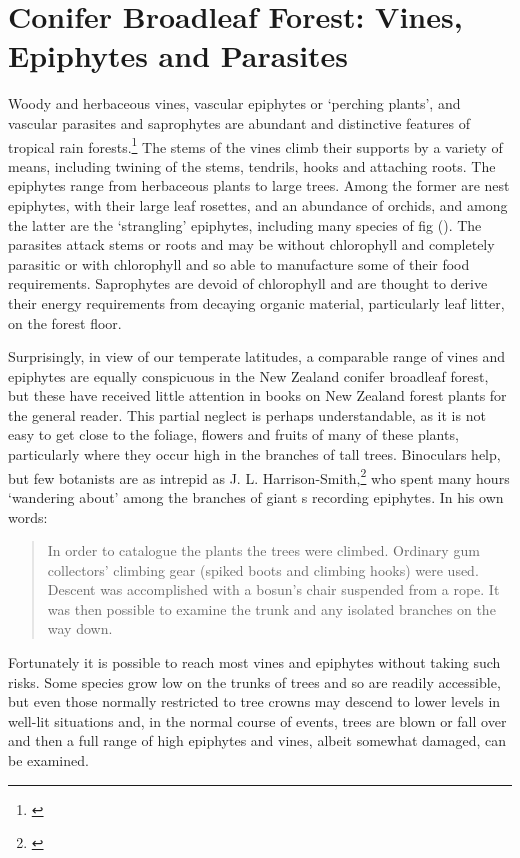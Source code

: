 \chapter{Conifer Broadleaf Forest: Vines, Epiphytes and Parasites}

Woody and herbaceous vines, vascular epiphytes or `perching plants', and vascular parasites and saprophytes are abundant and distinctive features of tropical rain forests.\footnote{\cite{richards1952tropical}}
The stems of the vines climb their supports by a variety of means, including twining of the stems, tendrils, hooks and attaching roots.
The epiphytes range from herbaceous plants to large trees.
Among the former are nest epiphytes, with their large leaf rosettes, and an abundance of orchids, and among the latter are the `strangling' epiphytes, including many species of fig ().
The parasites attack stems or roots and may be without chlorophyll and completely parasitic or with chlorophyll and so able to manufacture some of their food requirements.
Saprophytes are devoid of chlorophyll and are thought to derive their energy requirements from decaying organic material, particularly leaf litter, on the forest floor.

Surprisingly, in view of our temperate latitudes, a comparable range of vines and epiphytes are equally conspicuous in the New Zealand conifer broadleaf forest, but these have received little attention in books on New Zealand forest plants for the general reader.
This partial neglect is perhaps understandable, as it is not easy to get close to the foliage, flowers and fruits of many of these plants, particularly where they occur high in the branches of tall trees.
Binoculars help, but few botanists are as intrepid as J. L. Harrison-Smith,\footnote{\cite{harrisonsmith1938kauri}} who spent many hours `wandering about' among the branches of giant s recording epiphytes.
In his own words:

\begin{quote}
	In order to catalogue the plants the trees were climbed.
	Ordinary gum collectors' climbing gear (spiked boots and climbing hooks) were used.
	Descent was accomplished with a bosun's chair suspended from a rope.
	It was then possible to examine the trunk and any isolated branches on the way down.
\end{quote}

Fortunately it is possible to reach most vines and epiphytes without taking such risks.
Some species grow low on the trunks of trees and so are readily accessible, but even those normally restricted to tree crowns may descend to lower levels in well-lit situations and, in the normal course of events, trees are blown or fall over and then a full range of high epiphytes and vines, albeit somewhat damaged, can be examined.

